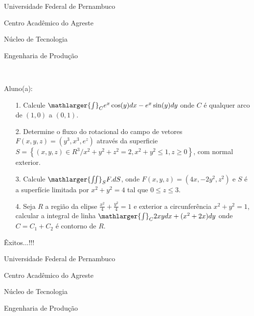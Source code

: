 \documentclass[oneside,a4paper,12pt]{article}
\newcommand{\universidade}{Universidade Federal de Pernambuco}
\newcommand{\centro}{Centro Acadêmico do Agreste}
\newcommand{\departamento}{Núcleo de Tecnologia}
\newcommand{\curso}{Engenharia de Produção}
\begin{document}
	\pagestyle{empty}
	
	\begin{center}
	 	\vspace{0pt}
	 	
		\universidade
		\par
		\centro
		\par
		\departamento
		\par
		\curso
		\par
		\vspace{08pt}
		\\
	\end{center}
	
	
	\begin{flushleft}
		Aluno(a):
	\end{flushleft}
	
\begin{itemize}
\item[1.] Calcule $\mathlarger{\int}_{C}e^{x}\cos(y)dx-e^{x}\sin(y)dy$ onde $C$ é qualquer arco de $(1,0)$ a $(0,1)$.
\end{itemize}
\begin{itemize}
\item[2.] Determine o fluxo do rotacional do campo de vetores $F(x,y,z)=(y^{3},x^{3},e^{z})$ através da superficie $S=\left\lbrace (x,y,z)\in R^{3} / x^{2}+y^{2}+z^{2}=2, x^{2}+y^{2}\leq 1, z\geq 0 \right\rbrace $, com normal exterior. 
 \end{itemize}
 \begin{itemize}
\item [3.] Calcule $\mathlarger{\iint}_{S}F.dS$, onde $F(x,y,z)=(4x,-2y^{2},z^{2})$ e $S$ é a superfície limitada por $x^{2}+y^{2}=4$ tal que $0\leq z \leq3$.
\end{itemize}
\begin{itemize}
\item[4.] Seja $R$ a região da elipse $\frac{x^{2}}{4}+\frac{y^{2}}{4}=1$ e exterior a circunferência $x^{2}+y^{2}=1$, calcular a integral de linha $\mathlarger{\int}_{C}2xydx+(x^{2}+2x)dy$ onde $C=C_{1}+C_{2}$ é contorno de $R$.
\end{itemize}

	\flushbottom
	\flushright
     Êxitos...!!!
     \begin{center}
     	\vspace{0pt}
     	
     	\universidade
     	\par
     	\centro
     	\par
     	\departamento
     	\par
     	\curso
     	\par
     	\vspace{08pt}
     	\\
     \end{center}
     
\end{document}
